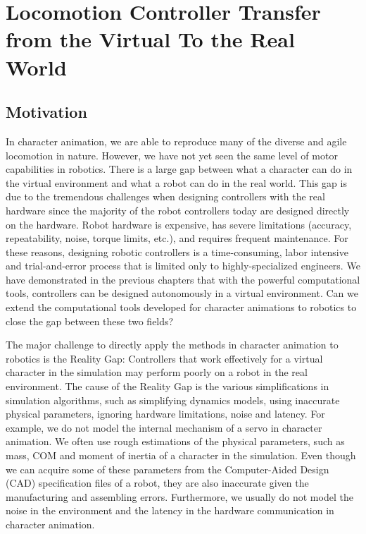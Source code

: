 \chapter{Locomotion Controller Transfer from the Virtual To the Real World}
\section{Motivation}
In character animation, we are able to reproduce many of the diverse and agile locomotion in nature. However, we have not yet seen the same level of motor capabilities in robotics. There is a large gap between what a character can do in the virtual environment and what a robot can do in the real world. This gap is due to the tremendous challenges when designing controllers with the real hardware since the majority of the robot controllers today are designed directly on the hardware. Robot hardware is expensive, has severe limitations (accuracy, repeatability, noise, torque limits, etc.), and requires frequent maintenance. For these reasons, designing robotic controllers is a time-consuming, labor intensive and trial-and-error process that is limited only to highly-specialized engineers. We have demonstrated in the previous chapters that with the powerful computational tools, controllers can be designed autonomously in a virtual environment. Can we extend the computational tools developed for character animations to robotics to close the gap between these two fields?

The major challenge to directly apply the methods in character animation to robotics is the Reality Gap: Controllers that work effectively for a virtual character in the simulation may perform poorly on a robot in the real environment. The cause of the Reality Gap is the various simplifications in simulation algorithms, such as simplifying dynamics models, using inaccurate physical parameters, ignoring hardware limitations, noise and latency. For example, we do not model the internal mechanism of a servo in character animation. We often use rough estimations of the physical parameters, such as mass, COM and moment of inertia of a character in the simulation. Even though we can acquire some of these parameters from the Computer-Aided Design (CAD) specification files of a robot, they are also inaccurate given the manufacturing and assembling errors. Furthermore, we usually do not model the noise in the environment and the latency in the hardware communication in character animation.

